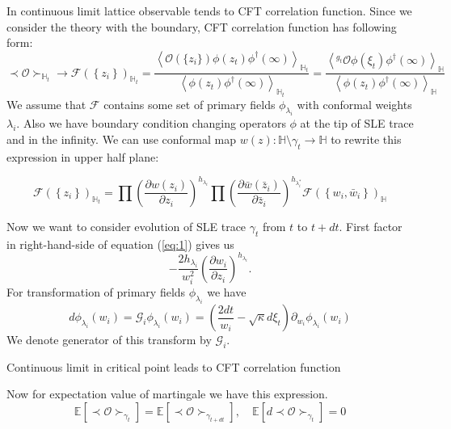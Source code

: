 \documentclass[12pt]{article}
\theoremstyle{definition}
\theoremstyle{definition} \newtheorem{Def}{Definition}
\begin{document}
In continuous limit lattice observable tends to CFT correlation function. Since we consider the theory with the boundary, CFT correlation function has following form:
\begin{equation*}
  \prec \mathcal{O} \succ_{\mathbb{H}_{t}}\to \mathcal{F}(\left\{z_{i}\right\})_{\mathbb{H}_{t}}=
  \frac{\left< \mathcal{O}(\{z_{i}\})\phi(z_{t})\phi^{\dagger}(\infty)\right>_{\mathbb{H}_{t}}}{\left<\phi(z_{t})\phi^{\dagger}(\infty)\right>_{\mathbb{H}_{t}}}=
  \frac{\left< ^{g_{t}}\mathcal{O}\phi(\xi_{t})\phi^{\dagger}(\infty)\right>_{\mathbb{H}}}{\left<\phi(z_{t})\phi^{\dagger}(\infty)\right>_{\mathbb{H}}}
\end{equation*}
We assume that $\mathcal{F}$ contains some set of primary fields $\phi_{\lambda_{i}}$ with conformal weights $\lambda_{i}$. Also we have boundary condition changing operators  $\phi$ at the tip of SLE trace and in the infinity.  We can use conformal map  $w(z):\mathbb{H}\setminus\gamma_{t}\to \mathbb{H}$ to rewrite this expression in upper half plane:

\begin{equation}
  \mathcal{F}(\left\{z_{i}\right\})_{\mathbb{H}_{t}}=\prod \left(\frac{\partial w(z_{i})}{\partial z_{i}}\right)^{h_{\lambda_i}} 
  \prod \left(\frac{\partial \bar w(\bar z_{i})}{\partial \bar z_{i}}\right)^{h_{\lambda^{*}_i}}
  \mathcal{F}(\left\{w_{i}, \bar w_{i}\right\})_{\mathbb{H}}
  \label{eq:1}
\end{equation}

Now we want to consider evolution of SLE trace $\gamma_{t}$ from  $t$ to $t+ dt$. First factor in right-hand-side of equation (\ref{eq:1}) gives us
\begin{equation*}
  -\frac{2h_{\lambda_{i}}}{w_{i}^{2}}\left(\frac{\partial w_{i}}{\partial z_{i}}\right)^{h_{\lambda_{i}}}.
\end{equation*}
For transformation of primary fields $\phi_{\lambda_{i}}$ we have 
\begin{equation}
  \label{eq:2}
  d\phi_{\lambda_{i}}(w_{i}) = \mathcal{G}_{i}\phi_{\lambda_{i}}(w_{i})=\left(\frac{2dt}{w_{i}}-\sqrt{\kappa} d\xi_{t}\right) \partial_{w_{i}}\phi_{\lambda_{i}}(w_{i}) 
\end{equation}
We denote generator of this transform by $\mathcal{G}_{i}$.



Continuous limit in critical point leads to CFT correlation function

Now for expectation value of martingale we have this expression.
\begin{equation*}
  \mathbb{E}\left[\prec\mathcal{O}\succ_{\gamma_{t}}\right]=    \mathbb{E}\left[\prec\mathcal{O}\succ_{\gamma_{t+dt}}\right], \quad \mathbb{E}\left[d \prec\mathcal{O}\succ_{\gamma_{t}}\right]=0
\end{equation*}
\end{document}
